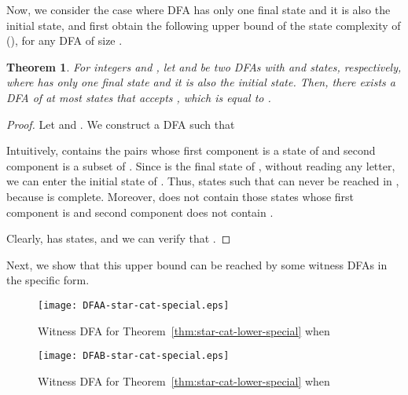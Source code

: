 \documentclass[10pt]{article}
\newtheorem{theorem}{Theorem}
\begin{document}
Now, we consider the case where DFA  has only one final state and it is also the initial state, and first obtain the following upper bound of the state complexity of  (), for any DFA  of size .
\begin{theorem}\label{thm:star-cat-upper-special}
For integers  and , let  and  be two DFAs with  and  states, respectively, where  has only one final state and it is also the initial state.
Then, there exists a DFA of at most  states that accepts , which is equal to .
\end{theorem}
\begin{proof}
Let  and .
We construct a DFA  such that

Intuitively,  contains the pairs whose first component is a state of  and second component is a subset of .
Since  is the final state of , without reading any letter, we can enter the initial state of .
Thus, states  such that  can never be reached in , because  is complete.
Moreover,  does not contain those states whose first component is  and second component does not contain .

Clearly,  has  states, and we can verify that .
\end{proof}

Next, we show that this upper bound can be reached by some witness DFAs in the specific form.

\begin{figure}[ht]
  \begin{center}
  \texttt{[image: DFAA-star-cat-special.eps]}
  \end{center}
  \caption{Witness DFA  for Theorem~\ref{thm:star-cat-lower-special} when }
\label{fig:DFAA-star-cat-special}
\end{figure}

\begin{figure}[ht]
  \begin{center}
  \texttt{[image: DFAB-star-cat-special.eps]}
  \end{center}
  \caption{Witness DFA  for Theorem~\ref{thm:star-cat-lower-special} when }
\label{fig:DFAB-star-cat-special}
\end{figure}
\end{document}
